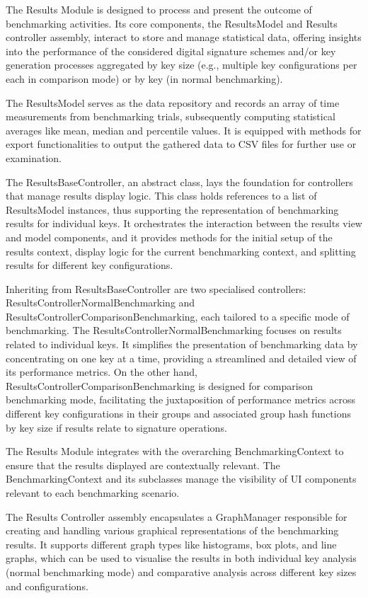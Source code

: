 \documentclass[]{final_report}
\theoremstyle{definition}
\begin{document}
The Results Module is designed to process and present the outcome of benchmarking activities. Its core components, the ResultsModel and Results controller assembly, interact to store and manage statistical data, offering insights into the performance of the considered digital signature schemes and/or key generation processes aggregated by key size (e.g., multiple key configurations per each in comparison mode) or by key (in normal benchmarking). 

The ResultsModel serves as the data repository and records an array of time measurements from benchmarking trials, subsequently computing statistical averages like mean, median and percentile values. It is equipped with methods for export functionalities to output the gathered data to CSV files for further use or examination.

The ResultsBaseController, an abstract class, lays the foundation for controllers that manage results display logic. This class holds references to a list of ResultsModel instances, thus supporting the representation of benchmarking results for individual keys. It orchestrates the interaction between the results view and model components, and it provides methods for the initial setup of the results context, display logic for the current benchmarking context, and splitting results for different key configurations.

Inheriting from ResultsBaseController are two specialised controllers: ResultsControllerNormalBenchmarking and ResultsControllerComparisonBenchmarking, each tailored to a specific mode of benchmarking. The ResultsControllerNormalBenchmarking focuses on results related to individual keys. It simplifies the presentation of benchmarking data by concentrating on one key at a time, providing a streamlined and detailed view of its performance metrics. On the other hand, ResultsControllerComparisonBenchmarking is designed for comparison benchmarking mode, facilitating the juxtaposition of performance metrics across different key configurations in their groups and associated group hash functions by key size if results relate to signature operations.

The Results Module integrates with the overarching BenchmarkingContext to ensure that the results displayed are contextually relevant. The BenchmarkingContext and its subclasses manage the visibility of UI components relevant to each benchmarking scenario.

The Results Controller assembly encapsulates a GraphManager responsible for creating and handling various graphical representations of the benchmarking results. It supports different graph types like histograms, box plots, and line graphs, which can be used to visualise the results in both individual key analysis (normal benchmarking mode) and comparative analysis across different key sizes and configurations.
\end{document}
